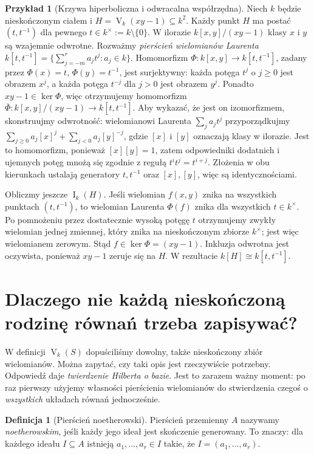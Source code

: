 \documentclass[11pt,a4paper,openany]{report}
\numberwithin{equation}{section}
\theoremstyle{plain}
\theoremstyle{definition}
\newtheorem{definicja}[twierdzenie]{Definicja}
\newtheorem{przyklad}[twierdzenie]{Przykład}
\theoremstyle{remark}
\newcommand{\V}{\operatorname V}
\newcommand{\I}{\operatorname I}
\newcommand{\kerf}{\operatorname{ker}}
\begin{document}
\begin{przyklad}[Krzywa hiperboliczna i odwracalna współrzędna]
Niech $k$ będzie nieskończonym ciałem i
$H=\V_k(xy-1)\subseteq k^2$. Każdy punkt $H$ ma postać
$(t,t^{-1})$ dla pewnego $t\in k^\times:=k\setminus\{0\}$.
W ilorazie $k[x,y]/(xy-1)$ klasy $x$ i $y$ są wzajemnie
odwrotne. Rozważmy \emph{pierścień wielomianów Laurenta}
$k[t,t^{-1}]=\{\sum_{j=-m}^r a_jt^j:a_j\in k\}$.
Homomorfizm $\Phi:k[x,y]\to k[t,t^{-1}]$, zadany przez
$\Phi(x)=t$, $\Phi(y)=t^{-1}$, jest surjektywny:
każda potęga $t^j$ o $j\ge0$ jest obrazem $x^j$, a każda
potęga $t^{-j}$ dla $j>0$ jest obrazem $y^j$.
Ponadto $xy-1\in\kerf\Phi$, więc otrzymujemy homomorfizm
$\overline\Phi:k[x,y]/(xy-1)\to k[t,t^{-1}]$.
Aby wykazać, że jest on izomorfizmem, skonstruujmy odwrotność:
wielomianowi Laurenta $\sum_j a_jt^j$ przyporządkujmy
$\sum_{j\ge0}a_j[x]^j+\sum_{j<0}a_j[y]^{-j}$,
gdzie $[x]$ i $[y]$ oznaczają klasy w ilorazie.
Jest to homomorfizm, ponieważ $[x][y]=1$, zatem
odpowiedniki dodatnich i ujemnych potęg mnożą się zgodnie
z regułą $t^it^j=t^{i+j}$. Złożenia w obu kierunkach
ustalają generatory $t,t^{-1}$ oraz $[x],[y]$, więc są identycznościami.

Obliczmy jeszcze $\I_k(H)$. Jeśli wielomian $f(x,y)$ znika na
wszystkich punktach $(t,t^{-1})$, to wielomian Laurenta
$\Phi(f)$ znika dla wszystkich $t\in k^\times$.
Po pomnożeniu przez dostatecznie wysoką potęgę $t$
otrzymujemy zwykły wielomian jednej zmiennej, który znika
na nieskończonym zbiorze $k^\times$; jest więc wielomianem zerowym.
Stąd $f\in\kerf\Phi=(xy-1)$. Inkluzja odwrotna jest
oczywista, ponieważ $xy-1$ zeruje się na $H$. W rezultacie
$k[H]\cong k[t,t^{-1}]$.
\end{przyklad}

\section{Dlaczego nie każdą nieskończoną rodzinę równań trzeba zapisywać?}

W definicji $\V_k(S)$ dopuściliśmy dowolny, także nieskończony
zbiór wielomianów. Można zapytać, czy taki opis jest rzeczywiście
potrzebny. Odpowiedź daje \emph{twierdzenie Hilberta o bazie}.
Jest to zarazem ważny moment: po raz pierwszy użyjemy własności
pierścienia wielomianów do stwierdzenia czegoś o \emph{wszystkich}
układach równań jednocześnie.

\begin{definicja}[Pierścień noetherowski]
Pierścień przemienny $A$ nazywamy \emph{noetherowskim}, jeśli każdy
jego ideał jest skończenie generowany.
To znaczy: dla każdego ideału $I\subseteq A$ istnieją
$a_1,\dots,a_r\in I$ takie, że $I=(a_1,\dots,a_r)$.
\end{definicja}
\end{document}
